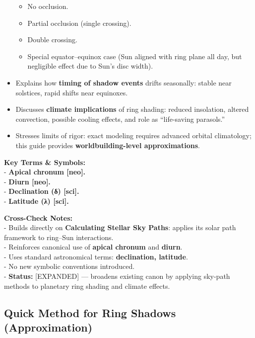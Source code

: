 \documentclass[
  letterpaper,
]{book}
\providecommand{\tightlist}{%
  \setlength{\itemsep}{0pt}\setlength{\parskip}{0pt}}
\begin{document}
\begin{itemize}
  \begin{itemize}
  \tightlist
  \item
    No occlusion.\\
  \item
    Partial occlusion (single crossing).\\
  \item
    Double crossing.\\
  \item
    Special equator--equinox case (Sun aligned with ring plane all day,
    but negligible effect due to Sun's disc width).\\
  \end{itemize}
\item
  Explains how \textbf{timing of shadow events} drifts seasonally:
  stable near solstices, rapid shifts near equinoxes.\\
\item
  Discusses \textbf{climate implications} of ring shading: reduced
  insolation, altered convection, possible cooling effects, and role as
  ``life-saving parasols.''\\
\item
  Stresses limits of rigor: exact modeling requires advanced orbital
  climatology; this guide provides \textbf{worldbuilding-level
  approximations}.
\end{itemize}

\textbf{Key Terms \& Symbols:}\\
- \textbf{Apical chronum {[}neo{]}.}\\
- \textbf{Diurn {[}neo{]}.}\\
- \textbf{Declination (δ) {[}sci{]}.}\\
- \textbf{Latitude (λ) {[}sci{]}.}

\textbf{Cross-Check Notes:}\\
- Builds directly on \textbf{Calculating Stellar Sky Paths}: applies its
solar path framework to ring--Sun interactions.\\
- Reinforces canonical use of \textbf{apical chronum} and
\textbf{diurn}.\\
- Uses standard astronomical terms: \textbf{declination, latitude}.\\
- No new symbolic conventions introduced.\\
- \textbf{Status:} {[}EXPANDED{]} --- broadens existing canon by
applying sky-path methods to planetary ring shading and climate effects.

\subsection{\texorpdfstring{\textbf{Quick Method for Ring Shadows
(Approximation)}}{Quick Method for Ring Shadows (Approximation)}}\label{quick-method-for-ring-shadows-approximation}
\end{document}
